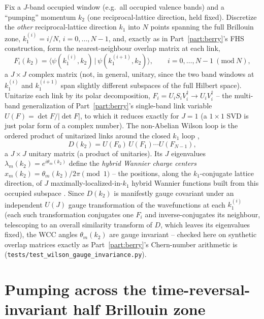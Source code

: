 \documentclass[11pt]{article}
\begin{document}
Fix a $J$-band occupied window (e.g.\ all occupied valence bands) and a ``pumping''
momentum $k_2$ (one reciprocal-lattice direction, held fixed). Discretize the
\emph{other} reciprocal-lattice direction $k_1$ into $N$ points spanning the full
Brillouin zone, $k_1^{(i)} = i/N$, $i=0,\dots,N-1$, and, exactly as in
Part~\ref{part:berry}'s FHS construction, form the nearest-neighbour overlap matrix at
each link,
\begin{equation}
  F_i(k_2) = \langle\psi(k_1^{(i)},k_2)\,|\,\psi(k_1^{(i+1)},k_2)\rangle,
  \qquad i=0,\dots,N-1 \ (\mathrm{mod}\ N),
  \label{eq:z2-link}
\end{equation}
a $J\times J$ complex matrix (not, in general, unitary, since the two band windows at
$k_1^{(i)}$ and $k_1^{(i+1)}$ span slightly different subspaces of the full Hilbert
space). Unitarize each link by its polar decomposition, $F_i = U_iS_iV_i^\dagger \to
U_iV_i^\dagger$ -- the multi-band generalization of Part~\ref{part:berry}'s single-band
link variable $U(F)=\det F/|\det F|$, to which it reduces exactly for $J=1$ (a $1\times1$
SVD is just polar form of a complex number). The non-Abelian Wilson loop is the ordered
product of unitarized links around the closed $k_1$ loop \cite{yu2011},
\begin{equation}
  D(k_2) = U(F_0)\,U(F_1)\cdots U(F_{N-1}),
  \label{eq:wilson-loop}
\end{equation}
a $J\times J$ unitary matrix (a product of unitaries). Its $J$ eigenvalues
$\lambda_m(k_2) = e^{i\theta_m(k_2)}$ define the \emph{hybrid Wannier charge centers}
$x_m(k_2) = \theta_m(k_2)/2\pi \pmod 1$ -- the positions, along the $k_1$-conjugate
lattice direction, of $J$ maximally-localized-in-$k_1$ hybrid Wannier functions built
from this occupied subspace \cite{yu2011,soluyanov2011}. Since $D(k_2)$ is manifestly
gauge covariant under an independent $U(J)$ gauge transformation of the wavefunctions at
each $k_1^{(i)}$ (each such transformation conjugates one $F_i$ and inverse-conjugates
its neighbour, telescoping to an overall similarity transform of $D$, which leaves its
eigenvalues fixed), the WCC angles $\theta_m(k_2)$ are gauge invariant -- checked here on
synthetic overlap matrices exactly as Part~\ref{part:berry}'s Chern-number arithmetic is
(\texttt{tests/test\_wilson\_gauge\_invariance.py}).

\section{Pumping across the time-reversal-invariant half Brillouin zone}
\end{document}
